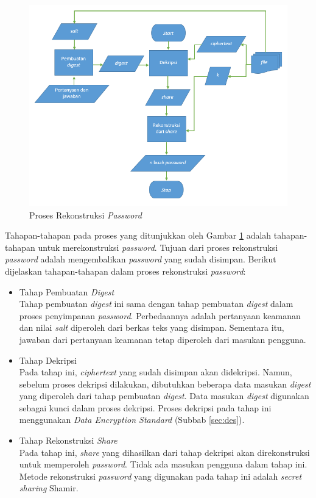\begin{figure}[H]
	\centerline{\includegraphics[scale=0.65]{Gambar/flowchart_reconstruct}}
	\caption{Proses Rekonstruksi \textit{Password}}\label{fig:flowchart_reconstruct_secret}
\end{figure}

Tahapan-tahapan pada proses yang ditunjukkan oleh Gambar \ref{fig:flowchart_reconstruct_secret} adalah tahapan-tahapan untuk merekonstruksi \textit{password}. Tujuan dari proses rekonstruksi \textit{password} adalah mengembalikan \textit{password} yang sudah disimpan. Berikut dijelaskan tahapan-tahapan dalam proses rekonstruksi \textit{password}:

\begin{itemize}
	\item Tahap Pembuatan \textit{Digest} \\
	Tahap pembuatan \textit{digest} ini sama dengan tahap pembuatan \textit{digest} dalam proses penyimpanan \textit{password}. Perbedaannya adalah pertanyaan keamanan dan nilai \textit{salt} diperoleh dari berkas teks yang disimpan. Sementara itu, jawaban dari pertanyaan keamanan tetap diperoleh dari masukan pengguna.
	\item Tahap Dekripsi \\
	Pada tahap ini, \textit{ciphertext} yang sudah disimpan akan didekripsi. Namun, sebelum proses dekripsi dilakukan, dibutuhkan beberapa data masukan \textit{digest} yang diperoleh dari tahap pembuatan \textit{digest}. Data masukan \textit{digest} digunakan sebagai kunci dalam proses dekripsi. Proses dekripsi pada tahap ini menggunakan \textit{Data Encryption Standard} (Subbab \ref{sec:des}).
	\item Tahap Rekonstruksi \textit{Share} \\
	Pada tahap ini, \textit{share} yang dihasilkan dari tahap dekripsi akan direkonstruksi untuk memperoleh \textit{password}. Tidak ada masukan pengguna dalam tahap ini. Metode rekonstruksi \textit{password} yang digunakan pada tahap ini adalah \textit{secret sharing} Shamir.
\end{itemize}

